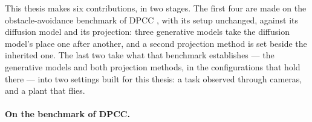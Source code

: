 This thesis makes six contributions, in two stages. The first four are made on the obstacle-avoidance
benchmark of \ac{DPCC} \parencite{romer2025diffusion,jia2024towards}, with its setup unchanged, against
its diffusion model and its projection: three generative models take the diffusion model's place one
after another, and a second projection method is set beside the inherited one. The last two take what
that benchmark establishes --- the generative models and both projection methods, in the
configurations that hold there --- into two settings built for this thesis: a task observed through
cameras, and a plant that flies.

\paragraph{On the benchmark of \ac{DPCC}.}
